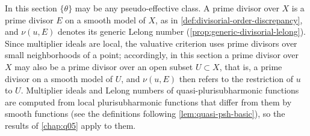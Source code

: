 In this section $\{\theta\}$ may be any pseudo-effective class. A prime divisor over $X$ is a prime divisor $E$ on a smooth model of $X$, as in \cref{def:divisorial-order-discrepancy}, and $\nu(u,E)$ denotes its generic Lelong number (\cref{prop:generic-divisorial-lelong}). Since multiplier ideals are local, the valuative criterion uses prime divisors over small neighborhoods of a point; accordingly, in this section a prime divisor over $X$ may also be a prime divisor over an open subset $U\subset X$, that is, a prime divisor on a smooth model of $U$, and $\nu(u,E)$ then refers to the restriction of $u$ to $U$. Multiplier ideals and Lelong numbers of quasi-plurisubharmonic functions are computed from local plurisubharmonic functions that differ from them by smooth functions (see the definitions following \cref{lem:quasi-psh-basic}), so the results of \cref{chap:q05} apply to them.

